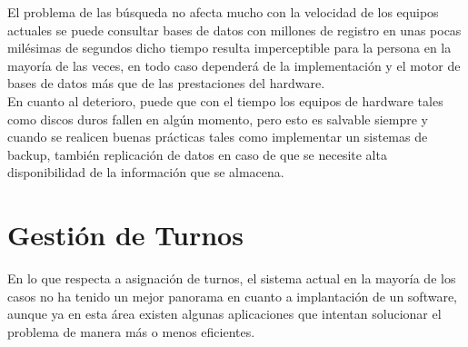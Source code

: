 El problema de las búsqueda no afecta mucho con la velocidad de los equipos actuales se puede consultar bases de datos con millones de registro en unas pocas milésimas de segundos dicho tiempo resulta imperceptible para la persona en la mayoría de las veces, en todo caso dependerá de la implementación y el motor de bases de datos más que de las prestaciones del hardware.\\[0.1cm]

En cuanto al deterioro, puede que con el tiempo los equipos de hardware tales como discos duros fallen en algún momento, pero esto es salvable siempre y cuando se realicen buenas prácticas tales como implementar un sistemas de backup, también replicación de datos en caso de que se necesite alta disponibilidad de la información que se almacena.\\[0.1cm]


\section{Gestión de Turnos}   

En lo que respecta a asignación de turnos, el sistema actual en la mayoría de los casos no ha tenido un mejor panorama en cuanto a implantación de un software, aunque ya en esta área existen algunas aplicaciones que intentan solucionar el problema de manera más o menos eficientes.\\[0.1cm]























